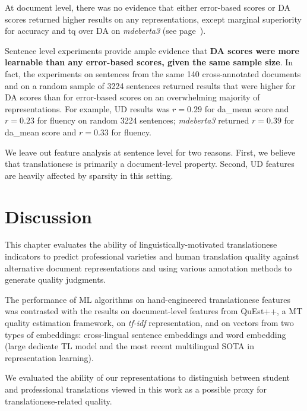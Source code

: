 

At document level, there was no evidence that either error-based scores or DA scores returned higher results on any representations, except marginal superiority for accuracy and tq over DA on \textit{mdeberta3} (see page~\pageref{tab:err140rand_res}).

Sentence level experiments provide ample evidence that \textbf{DA scores were more learnable than any error-based scores, given the same sample size}. In fact, the experiments on sentences from the same 140 cross-annotated documents and on a random sample of 3224 sentences returned results that were higher for DA scores than for error-based scores on an overwhelming majority of representations. 
For example, UD results was $r=0.29$ for da\_mean score and $r=0.23$ for fluency on random 3224 sentences; \textit{mdeberta3} returned $r=0.39$ for da\_mean score and $r=0.33$ for fluency.

We leave out feature analysis at sentence level for two reasons. First, we believe that translationese is primarily a document-level property. Second, UD features are heavily affected by sparsity in this setting. 

\section{\label{sec:qua_disc}Discussion}
This chapter evaluates the ability of linguistically-motivated translationese indicators to predict professional varieties and human translation quality against alternative document representations and using various annotation methods to generate quality judgments. 

The performance of ML algorithms on hand-engineered translationese features was contrasted with the results on document-level features from QuEst++, a MT quality estimation framework, on \textit{tf-idf} representation, and on vectors from two types of embeddings: cross-lingual sentence embeddings and word embedding (large dedicate TL model and the most recent multilingual SOTA in representation learning).

We evaluated the ability of our representations to distinguish between student and professional translations viewed in this work as a possible proxy for translationese-related quality.

